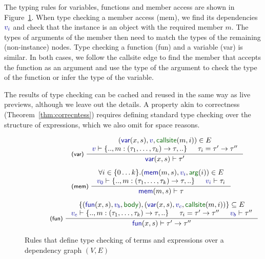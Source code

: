 \documentclass[english,submission]{programming}
\theoremstyle{plain}
\theoremstyle{definition}
\newcommand{\bndclr}[1]{\textcolor{kvdclr}{#1}}
\newcommand{\bnd}[1]{\textnormal{\textcolor{kvdclr}{\sffamily #1}}}
\newcommand{\blbl}[1]{\textnormal{\textcolor{numclr}{\sffamily #1}}}
\newcommand{\rname}[1]{{\sffamily(#1)}}
\begin{document}
The typing rules for variables, functions and member access are shown in Figure~\ref{fig:tc}.
When type checking a member access \rname{mem}, we find its dependencies $\bndclr{v_i}$ and
check that the instance is an object with the required member $m$. The types of arguments of the
member then need to match the types of the remaining (non-instance) nodes.
Type checking a function \rname{fun} and a variable \rname{var} is similar. In both cases,
we follow the \blbl{callsite} edge to find the member that accepts the function as an argument
and use the type of the argument to check the type of the function or infer the type of the
variable.

The results of type checking can be cached and reused in the same way as live previews, although
we leave out the details. A property akin to correctness (Theorem~\ref{thm:correcntess})
requires defining standard type checking over the structure of expressions, which we also
omit for space reasons.


\begin{figure}
\begin{equation*}
\hspace{-1em}
\begin{array}{l}
\hspace{7em}\inference[\rname{var}~]
  { (\bnd{var}(x,s), \bndclr{v}, \blbl{callsite}(m, i)) \in E \\
    \bndclr{v} \vdash \{.., m:(\tau_1, \ldots, \tau_k)\rightarrow \tau,..\} & \tau_i=\tau'\rightarrow\tau'' }
  { \bnd{var}(x, s) \vdash \tau' }
\\[1.5em]
\hspace{7em}\inference[\rname{mem}~]
  { \forall i\in\{0\ldots k\}.(\bnd{mem}(m, s), \bndclr{v_i}, \blbl{arg}(i)) \in E \\
  \bndclr{v_0} \vdash \{.., m:(\tau_1, \ldots, \tau_k) \rightarrow \tau, ..\} & \bndclr{v_i} \vdash \tau_i }
  { \bnd{mem}(m, s) \vdash \tau }
\\[1.5em]
\hspace{4em}\inference[\rname{fun}~]
  { \{(\bnd{fun}(x,s), \bndclr{v_b}, \blbl{body}), (\bnd{var}(x,s), \bndclr{v_c}, \blbl{callsite}(m, i))\} \subseteq E \\
    \bndclr{v_c} \vdash \{.., m:(\tau_1, \ldots, \tau_k)\rightarrow \tau,..\} &
    \tau_i=\tau'\rightarrow\tau'' & \bndclr{v_b} \vdash \tau'' }
  { \bnd{fun}(x, s) \vdash \tau' \rightarrow \tau'' }
\end{array}
\end{equation*}
\vspace{-0.5em}
\caption{Rules that define type checking of terms and expressions over a dependency graph $(V, E)$}
\label{fig:tc}
\vspace{-0.5em}
\end{figure}
\end{document}
